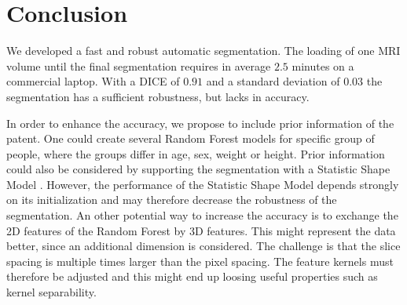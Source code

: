 \section{Conclusion}
We developed a fast and robust automatic segmentation. The loading of one MRI volume until the final segmentation requires in average $2.5$ minutes on a commercial laptop. With a DICE of $0.91$ and a standard deviation of $0.03$ the segmentation has a sufficient robustness, but lacks in accuracy.

In order to enhance the accuracy, we propose to include prior information of the patent. One could create several Random Forest models for specific group of people, where the groups differ in age, sex, weight or height. Prior information could also be considered by supporting the segmentation with a Statistic Shape Model \cite{heimann2009statistical}. However, the performance of the Statistic Shape Model depends strongly on its initialization and may therefore decrease the robustness of the segmentation.
An other potential way to increase the accuracy is to exchange the 2D features of the Random Forest by 3D features. This might represent the data better, since an additional dimension is considered. The challenge is that the slice spacing is multiple times larger than the pixel spacing. The feature kernels must therefore be adjusted and this might end up loosing useful properties such as kernel separability.
